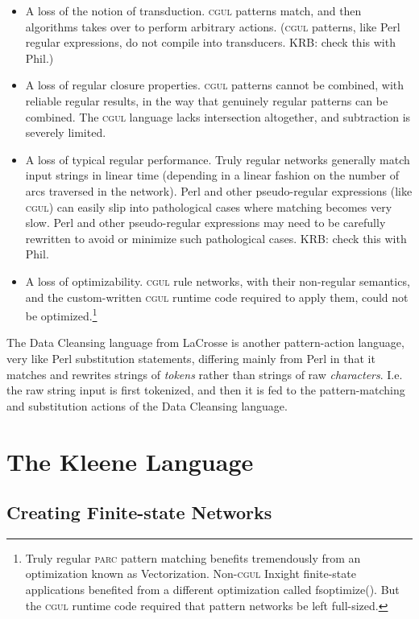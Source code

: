 \documentclass[letterpaper,12pt]{article}
\providecommand{\acro}{}\renewcommand{\acro}{\textsc}
\begin{document}
\begin{itemize}
\item
A loss of the notion of transduction.  \acro{cgul} patterns match, and then algorithms takes over to perform
arbitrary actions.  (\acro{cgul} patterns, like Perl regular expressions,
do not compile into transducers.  KRB: check this with Phil.)
\item
A loss of regular closure properties.  \acro{cgul} patterns cannot be combined, with reliable regular
results, in the way that genuinely regular patterns can be combined.  The
\acro{cgul} language lacks intersection altogether, and subtraction is
severely limited.
\item
A loss of typical regular performance.  Truly regular networks generally match input strings in linear
time (depending in a linear fashion on the number of arcs traversed in the
network).  Perl and other
pseudo-regular expressions (like \acro{cgul}) can easily slip into pathological cases where matching becomes
very slow.  Perl and other pseudo-regular expressions may need to be carefully rewritten to avoid or
minimize such pathological cases.  KRB:  check this with Phil.
\item
A loss of optimizability.  \acro{cgul} rule networks, with their non-regular semantics, and the
custom-written \acro{cgul} runtime code required to apply them, could not
be optimized.\footnote{Truly regular \acro{parc}
pattern matching benefits tremendously from an optimization known as Vectorization.  Non-\acro{cgul} Inxight
finite-state applications benefited from a different optimization called
fsoptimize().  But the \acro{cgul} runtime
code required that pattern networks be left full-sized.}
\end{itemize}

The Data Cleansing language from LaCrosse is another pattern-action language, very like Perl substitution statements, 
differing mainly from Perl in that it
matches and rewrites strings of \emph{tokens} rather than strings of raw \emph{characters}.  I.e. the raw string input is
first tokenized, and then it is fed to the pattern-matching and substitution actions of the Data
Cleansing language.  

\section{The Kleene Language}

\subsection{Creating Finite-state Networks}
\end{document}

